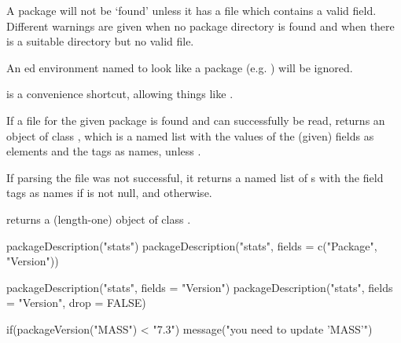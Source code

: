 %
\begin{Details}\relax
A package will not be `found' unless it has a  file
which contains a valid  field.  Different warnings are
given when no package directory is found and when there is a suitable
directory but no valid  file.

An ed environment named to look like a package
(e.g. ) will be ignored.

 is a convenience shortcut, allowing things
like .
\end{Details}
%
\begin{Value}
If a  file for the given package is found and can
successfully be read,  returns an object of
class , which is a named list with the
values of the (given) fields as elements and the tags as names, unless
.

If parsing the  file was not successful, it returns
a named list of s with the field tags as names if 
is not null, and  otherwise.

 returns a (length-one) object of class
.
\end{Value}
%
\begin{SeeAlso}\relax
{}
\end{SeeAlso}
%
\begin{Examples}
\begin{ExampleCode}

packageDescription("stats")
packageDescription("stats", fields = c("Package", "Version"))

packageDescription("stats", fields = "Version")
packageDescription("stats", fields = "Version", drop = FALSE)

if(packageVersion("MASS") < "7.3")
  message("you need to update 'MASS'")
\end{ExampleCode}
\end{Examples}
